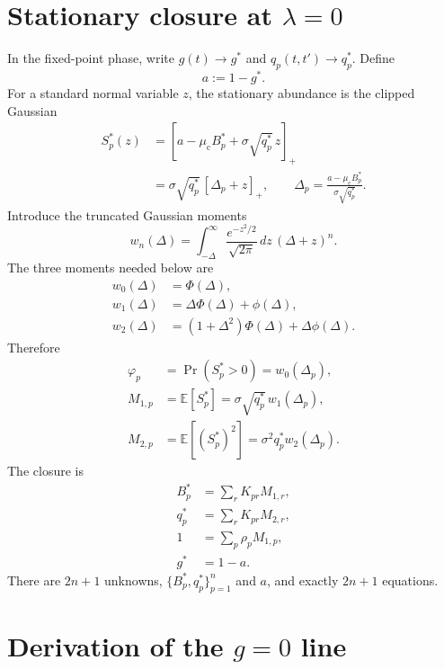 \documentclass[11pt]{article}
\newcommand{\E}{\mathbb E}
\newcommand{\Dz}{\frac{e^{-z^2/2}}{\sqrt{2\pi}}\,dz}
\newcommand{\mc}{\mu_{\mathrm c}}
\begin{document}
\section{Stationary closure at $\lambda=0$}

In the fixed-point phase, write $g(t)\to g^*$ and
$q_p(t,t')\to q_p^*$.  Define
\begin{equation}
  a:=1-g^*.
  \label{eq:a-definition}
\end{equation}
For a standard normal variable $z$, the stationary abundance is the clipped
Gaussian
\begin{align}
  S_p^*(z)
  &=\left[a-\mc B_p^*+\sigma\sqrt{q_p^*}\,z\right]_+\\
  &=\sigma\sqrt{q_p^*}\,[\Delta_p+z]_+,
  \qquad
  \Delta_p=\frac{a-\mc B_p^*}{\sigma\sqrt{q_p^*}}.
  \label{eq:clipped-law}
\end{align}
Introduce the truncated Gaussian moments
\begin{equation}
  w_n(\Delta)=\int_{-\Delta}^{\infty}\Dz\,(\Delta+z)^n.
\end{equation}
The three moments needed below are
\begin{align}
  w_0(\Delta)&=\Phi(\Delta),\\
  w_1(\Delta)&=\Delta\Phi(\Delta)+\phi(\Delta),\\
  w_2(\Delta)&=(1+\Delta^2)\Phi(\Delta)+\Delta\phi(\Delta).
\end{align}
Therefore
\begin{align}
  \varphi_p&=\Pr(S_p^*>0)=w_0(\Delta_p),\\
  M_{1,p}&=\E[S_p^*]
   =\sigma\sqrt{q_p^*}\,w_1(\Delta_p),\\
  M_{2,p}&=\E[(S_p^*)^2]
   =\sigma^2q_p^*w_2(\Delta_p).
  \label{eq:stationary-moments}
\end{align}
The closure is
\begin{align}
  B_p^*&=\sum_rK_{pr}M_{1,r},
  \label{eq:B-closure}\\
  q_p^*&=\sum_rK_{pr}M_{2,r},
  \label{eq:q-closure}\\
  1&=\sum_p\rho_pM_{1,p},
  \label{eq:normalization}\\
  g^*&=1-a.
  \label{eq:g-fixed}
\end{align}
There are $2n+1$ unknowns, $\{B_p^*,q_p^*\}_{p=1}^n$ and $a$, and exactly
$2n+1$ equations.

\section{Derivation of the $g=0$ line}
\end{document}
